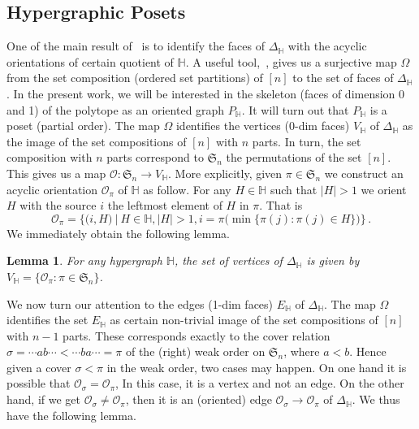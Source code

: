 \documentclass[reqno]{amsart}
\newtheorem{lemma}[theorem]{Lemma}
\theoremstyle{definition}
\newcommand{\fS}{\mathfrak{S}} %
\newcommand{\Or}{\mathcal O}  %
\newcommand{\HH}{\mathbb H}  %
\begin{document}
\subsection{Hypergraphic Posets} 
\label{subsec:P_H}
One of the main result of~\cite[Thm 3.18]{BenBerMac} is to identify the faces of $\Delta_\HH$ with the acyclic orientations of certain quotient of $\HH$.  A useful tool,~\cite[Lem 2.9]{BenBerMac}, gives us a surjective map $\Omega$ from the set composition (ordered set partitions) of $[n]$ to the set of faces of $\Delta_\HH$. 
 In the present work, we will be interested in the skeleton (faces of dimension 0 and 1)
of the polytope as an oriented graph $P_{\HH}$. It will turn out that $P_{\HH}$ is a poset (partial order).  The map $\Omega$ identifies the vertices (0-dim faces) $V_{\HH}$  of $\Delta_{\HH}$ as the image of the set compositions of $[n]$ with $n$ parts. In turn, the set composition with $n$ parts correspond to $\fS_n$ the permutations of the set $[n]$. This gives us a map $\Or \colon \fS_n \to V_{\HH}$.
More explicitly, given $\pi\in\fS_n$ we construct an acyclic orientation $\Or_\pi$ of $\HH$ as follow. For any $H\in \HH$ such that $|H|>1$ we orient $H$  with the source $i$  the leftmost element of $H$ in $\pi$. That is
\begin{equation}\label{eq:orientation}
	\Or_\pi = \Big\{\big(i,H\big)\ \big| \ H\in \HH, |H|>1,  i=\pi\big(\min\{\pi(j): \pi(j)\in H\}\big)\Big\}\,.
\end{equation}
We immediately obtain the following lemma.

\begin{lemma}\label{lem:Hvertices}
For any hypergraph $\HH$, the set of vertices of $\Delta_{\HH}$ is given by $V_{\HH}=\{\Or_\pi: \pi\in \fS_n\}$.
\end{lemma}

We now turn our attention to the edges (1-dim faces) $E_{\HH}$ of $\Delta_{\HH}$. The map $\Omega$ identifies the set $E_{\HH}$ as certain non-trivial image of the set compositions of $[n]$ with $n-1$ parts.
These corresponds  exactly to the cover relation $\sigma=\cdots ab \cdots < \cdots ba\cdots =\pi$ of the (right) weak order on $\fS_n$, where $a<b$. 
Hence given a cover $\sigma < \pi$ in the weak  order, two cases may happen. On one hand it is possible that $\Or_\sigma=\Or_\pi$, In this case, it is a vertex and not an edge. On the other hand, if we get 
 $\Or_\sigma\ne \Or_\pi$, then it is an (oriented) edge $\Or_\sigma\to\Or_\pi$ of $\Delta_{\HH}$. We thus have the following lemma.
\end{document}
